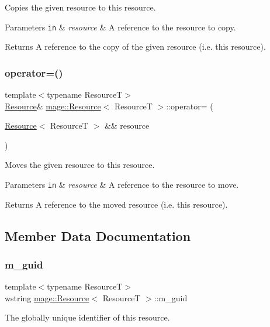 Copies the given resource to this resource.


\begin{DoxyParams}[1]{Parameters}
\mbox{\tt in}  & {\em resource} & A reference to the resource to copy. \\
\hline
\end{DoxyParams}
\begin{DoxyReturn}{Returns}
A reference to the copy of the given resource (i.\+e. this resource). 
\end{DoxyReturn}
\mbox{\label{classmage_1_1_resource_aa1f7a7ddd31f4fc16293b4a5ca9a93c8}} 
\subsubsection{\texorpdfstring{operator=()}{operator=()}\hspace{0.1cm}{\footnotesize\ttfamily [2/2]}}
{\footnotesize\ttfamily template$<$typename ResourceT$>$ \\
\mbox{\hyperlink{classmage_1_1_resource}{Resource}}\& \mbox{\hyperlink{classmage_1_1_resource}{mage\+::\+Resource}}$<$ ResourceT $>$\+::operator= (\begin{DoxyParamCaption}\item[{\mbox{\hyperlink{classmage_1_1_resource}{Resource}}$<$ ResourceT $>$ \&\&}]{resource }\end{DoxyParamCaption})\hspace{0.3cm}{\ttfamily [noexcept]}}

Moves the given resource to this resource.


\begin{DoxyParams}[1]{Parameters}
\mbox{\tt in}  & {\em resource} & A reference to the resource to move. \\
\hline
\end{DoxyParams}
\begin{DoxyReturn}{Returns}
A reference to the moved resource (i.\+e. this resource). 
\end{DoxyReturn}


\subsection{Member Data Documentation}
\mbox{\label{classmage_1_1_resource_ac8cf21b8b48c47a104110e12e259ad99}} 
\subsubsection{\texorpdfstring{m\+\_\+guid}{m\_guid}}
{\footnotesize\ttfamily template$<$typename ResourceT$>$ \\
wstring \mbox{\hyperlink{classmage_1_1_resource}{mage\+::\+Resource}}$<$ ResourceT $>$\+::m\+\_\+guid\hspace{0.3cm}{\ttfamily [private]}}

The globally unique identifier of this resource. 